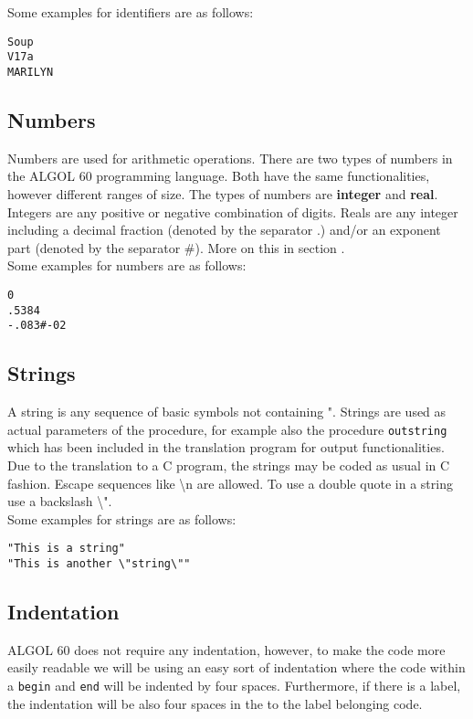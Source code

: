 \documentclass{article}
\begin{document}
Some examples for identifiers are as follows:\\

\begin{lstlisting}[language={[60]algol}]
Soup
V17a
MARILYN
\end{lstlisting}

\subsection{Numbers} \label{numbers}
Numbers are used for arithmetic operations. There are two types of numbers in the ALGOL 60 programming language. Both have the same functionalities, however different ranges of size. The types of numbers are \textbf{integer} and \textbf{real}. Integers are any positive or negative combination of digits. Reals are any integer including a decimal fraction (denoted by the separator .) and/or an exponent part (denoted by the separator \#). More on this in section .\\ 

Some examples for numbers are as follows:\\

\begin{lstlisting}[language={[60]algol}]
0
.5384
-.083#-02
\end{lstlisting}

\subsection{Strings}
A string is any sequence of basic symbols not containing ". Strings are used as actual parameters of the procedure, for example also the procedure \texttt{outstring} which has been included in the translation program for output functionalities. Due to the translation to a C program, the strings may be coded as usual in C fashion. Escape sequences like \textbackslash n are allowed. To use a double quote in a string use a backslash \textbackslash".\\ 

Some examples for strings are as follows:\\

\begin{lstlisting}[language={[60]algol}]
"This is a string"
"This is another \"string\""
\end{lstlisting}

\subsection{Indentation}
ALGOL 60 does not require any indentation, however, to make the code more easily readable we will be using an easy sort of indentation where the code within a \texttt{begin} and \texttt{end} will be indented by four spaces. Furthermore, if there is a label, the indentation will be also four spaces in the to the label belonging code.
\end{document}
